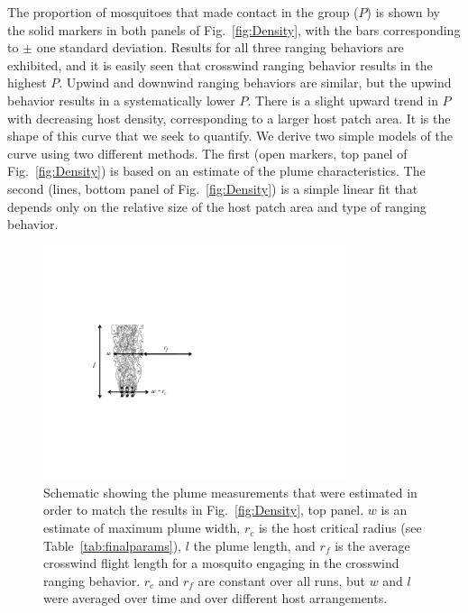 \documentclass[12pt]{article}
\newcommand{\mycaption}[1]{\caption{#1}}
\begin{document}
The proportion of mosquitoes that made contact in the group ($P$) is shown by the solid markers in both panels of Fig.~\ref{fig:Density}, with the bars corresponding to $\pm$ one standard deviation. Results for all three ranging behaviors are exhibited, and it is easily seen that crosswind ranging behavior results in the highest $P$. Upwind and downwind ranging behaviors are similar, but the upwind behavior results in a systematically lower $P$. There is a slight upward trend in $P$ with decreasing host density, corresponding to a larger host patch area. It is the shape of this curve that we seek to quantify. We derive two simple models of the curve using two different methods. The first (open markers, top panel of Fig.~\ref{fig:Density}) is based on an estimate of the plume characteristics. The second (lines, bottom panel of Fig.~\ref{fig:Density}) is a simple linear fit that depends only on the relative size of the host patch area and type of ranging behavior.

\begin{figure}[ht]
	\centering
	\includegraphics[width=3.5in]{figures/densitypredschematic.pdf}
\mycaption{Schematic showing the plume measurements that were estimated in order to match the results in Fig.~\ref{fig:Density}, top panel. $w$ is an estimate of maximum plume width, $r_c$ is the host critical radius (see Table~\ref{tab:finalparams}), $l$ the plume length, and $r_f$ is the average crosswind flight length for a mosquito engaging in the crosswind ranging behavior. $r_c$ and $r_f$ are constant over all runs, but $w$ and $l$ were averaged over time and over different host arrangements.}
	\label{fig:denschematic}
\end{figure}
\end{document}
